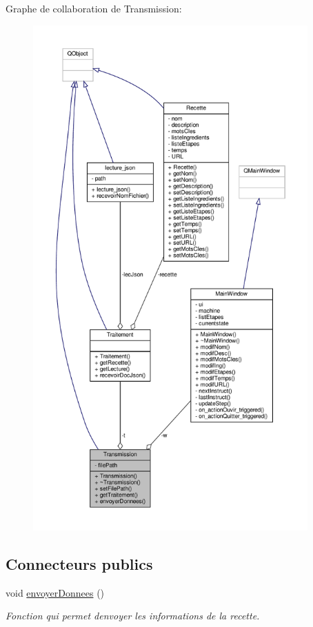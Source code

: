 Graphe de collaboration de Transmission\+:\nopagebreak
\begin{figure}[H]
\begin{center}
\leavevmode
\includegraphics[height=550pt]{classTransmission__coll__graph}
\end{center}
\end{figure}
\subsection*{Connecteurs publics}
\begin{DoxyCompactItemize}
\item 
void \hyperlink{classTransmission_a14b885539e973a158c9c4c25fd99bc04}{envoyer\+Donnees} ()
\begin{DoxyCompactList}\small\item\em Fonction qui permet d\textquotesingle{}envoyer les informations de la recette. \end{DoxyCompactList}\end{DoxyCompactItemize}
